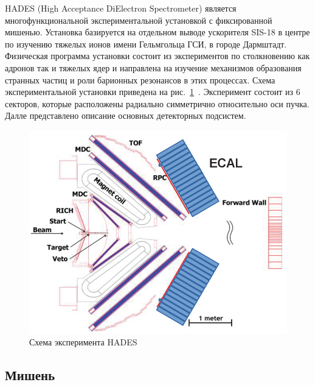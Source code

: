 HADES (High Acceptance DiElectron Spectrometer) является многофункциональной экспериментальной установкой с фиксированной мишенью.
Установка базируется на отдельном выводе ускорителя SIS-18 в центре по изучению тяжелых ионов имени Гельмгольца ГСИ, в городе Дармштадт.
Физическая программа установки состоит из экспериментов по столкновению как адронов так и тяжелых ядер и направлена на изучение механизмов образования странных частиц и роли барионных резонансов в этих процессах. 
Схема экспериментальной установки приведена на рис.~\ref{fig:hades_bmn_layouts}~\cite{HADES:2009aat}.
Эксперимент состоит из 6 секторов, которые расположены радиально симметрично относительно оси пучка.
Далле представлено описание основных детекторных подсистем.
%
\begin{figure}[ht]
\begin{center}
\includegraphics[width=0.75\linewidth]{images/hades_layout.jpg}
\caption{Схема эксперимента HADES}
\label{fig:hades_bmn_layouts}
\end{center}
\end{figure}

\subsection{ Мишень }

